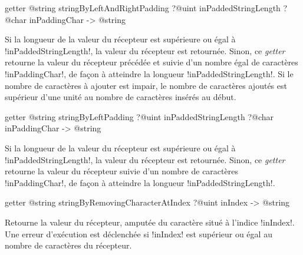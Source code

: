 
\begin{galgasbox}
getter @string stringByLeftAndRightPadding
   ?@uint inPaddedStringLength
   ?@char inPaddingChar -> @string
\end{galgasbox}

Si la longueur de la valeur du récepteur est supérieure ou égal à \ggs!inPaddedStringLength!, la valeur du récepteur est retournée. Sinon, ce \emph{getter} retourne la valeur du récepteur précédée et suivie d'un nombre égal de caractères \ggs!inPaddingChar!, de façon à atteindre la longueur \ggs!inPaddedStringLength!. Si le nombre de caractères à ajouter est impair, le nombre de caractères ajoutés est supérieur d'une unité au nombre de caractères insérés au début.









\begin{galgasbox}
getter @string stringByLeftPadding
   ?@uint inPaddedStringLength
   ?@char inPaddingChar -> @string
\end{galgasbox}

Si la longueur de la valeur du récepteur est supérieure ou égal à \ggs!inPaddedStringLength!, la valeur du récepteur est retournée. Sinon, ce \emph{getter} retourne la valeur du récepteur suivie d'un nombre de caractères \ggs!inPaddingChar!, de façon à atteindre la longueur \ggs!inPaddedStringLength!.








\begin{galgasbox}
getter @string stringByRemovingCharacterAtIndex ?@uint inIndex -> @string
\end{galgasbox}

Retourne la valeur du récepteur, amputée du caractère situé à l'indice \ggs!inIndex!. Une erreur d'exécution est déclenchée si \ggs!inIndex! est supérieur ou égal au nombre de caractères du récepteur.








